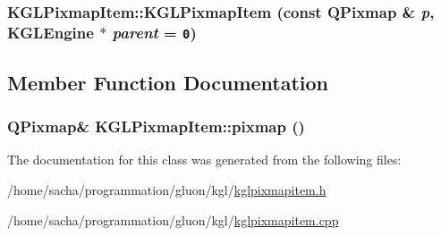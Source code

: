 \hypertarget{class_k_g_l_pixmap_item_8fe07e2180e081aa135b613388377e70}{
\subsubsection[{KGLPixmapItem}]{\setlength{\rightskip}{0pt plus 5cm}KGLPixmapItem::KGLPixmapItem (const QPixmap \& {\em p}, \/  {\bf KGLEngine} $\ast$ {\em parent} = {\tt 0})}}
\label{class_k_g_l_pixmap_item_8fe07e2180e081aa135b613388377e70}




\subsection{Member Function Documentation}
\hypertarget{class_k_g_l_pixmap_item_5f5bdbb102070403f1fdbd046b4e0a61}{
\subsubsection[{pixmap}]{\setlength{\rightskip}{0pt plus 5cm}QPixmap\& KGLPixmapItem::pixmap ()}}
\label{class_k_g_l_pixmap_item_5f5bdbb102070403f1fdbd046b4e0a61}




The documentation for this class was generated from the following files:\begin{CompactItemize}
\item 
/home/sacha/programmation/gluon/kgl/\hyperlink{kglpixmapitem_8h}{kglpixmapitem.h}\item 
/home/sacha/programmation/gluon/kgl/\hyperlink{kglpixmapitem_8cpp}{kglpixmapitem.cpp}\end{CompactItemize}
